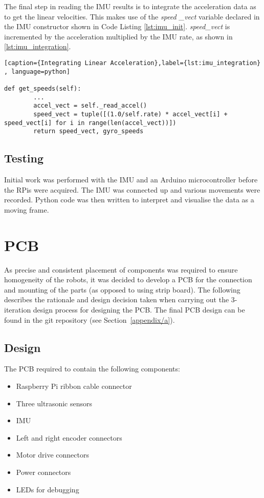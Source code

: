 The final step in reading the IMU results is to integrate the acceleration
data as to get the linear velocities. This makes use of the \textit{speed
\_vect} variable declared in the IMU constructor shown in Code Listing
\ref{lst:imu_init}. \textit{speed\_vect} is incremented by the
acceleration multiplied by the IMU rate, as shown in
\ref{lst:imu_integration}.

\begin{lstlisting}[caption={Integrating Linear Acceleration},label={lst:imu_integration} , language=python]

def get_speeds(self):
		...
        accel_vect = self._read_accel()
        speed_vect = tuple([(1.0/self.rate) * accel_vect[i] + speed_vect[i] for i in range(len(accel_vect))])
        return speed_vect, gyro_speeds
\end{lstlisting}


\subsection{Testing}\label{elec/imu/test}
Initial work was performed with the IMU and an Arduino microcontroller before the RPis were acquired. The IMU was connected up and various movements were recorded. Python code was then written to interpret and visualise the data as a moving frame.

\section{PCB}\label{elec/pcb}
As precise and consistent placement of components was required to ensure homogeneity of the robots, it was decided to develop a PCB for the connection and mounting of the parts (as opposed to using strip board). The following describes the rationale and design decision taken when carrying out the 3-iteration design process for designing the PCB. The final PCB design can be found in the git repository (see Section~\ref{appendix/a}).

\subsection{Design}\label{elec/pcb/design}
The PCB required to contain the following components:
\begin{itemize}
  \item Raspberry Pi ribbon cable connector
  \item Three ultrasonic sensors
  \item IMU
  \item Left and right encoder connectors
  \item Motor drive connectors
  \item Power connectors
  \item LEDs for debugging
\end{itemize}

